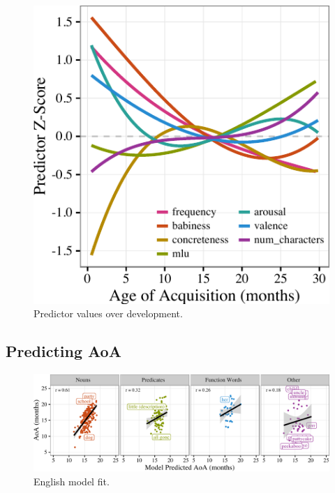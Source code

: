 \documentclass[10pt, letterpaper]{article}
\newenvironment{CodeChunk}{}{}
\begin{document}
\begin{CodeChunk}
\begin{figure}[tb]

{\centering \includegraphics{figs/devo-1} 

}

\caption[Predictor values over development]{Predictor values over development.}\label{fig:devo}
\end{figure}
\end{CodeChunk}

\subsection{Predicting AoA}\label{predicting-aoa}

\begin{CodeChunk}
\begin{figure}[tb]

{\centering \includegraphics{figs/fit-1} 

}

\caption[English model fit]{English model fit.}\label{fig:fit}
\end{figure}
\end{CodeChunk}
\end{document}
